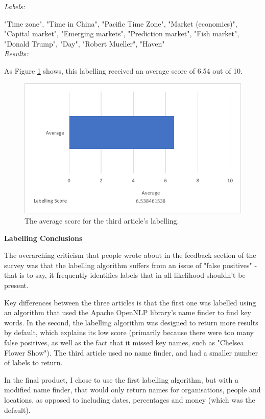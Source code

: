 \documentclass[12pt]{article}
\begin{document}
\emph{Labels:}

"Time zone", "Time in China", "Pacific Time Zone", "Market (economics)", "Capital market", "Emerging markets", "Prediction market", "Fish market", "Donald Trump", "Day", "Robert Mueller", "Haven" \\

\emph{Results:}

As Figure \ref{label3} shows, this labelling received an average score of 6.54 out of 10.

\begin{figure}[ht!]
  \centering
    \includegraphics[scale=0.7]{label3score.png}
   \caption[The average score for a labelling]{The average score for the third article's labelling.}
   \label{label3}
\end{figure} 

\textbf{Labelling Conclusions}

The overarching criticism that people wrote about in the feedback section of the survey was that the labelling algorithm suffers from an issue of "false positives" - that is to say, it frequently identifies labels that in all likelihood shouldn't be present.

Key differences between the three articles is that the first one was labelled using an algorithm that used the Apache OpenNLP library's name finder to find key words. In the second, the labelling algorithm was designed to return more results by default, which explains its low score (primarily because there were too many false positives, as well as the fact that it missed key names, such as "Chelsea Flower Show"). The third article used no name finder, and had a smaller number of labels to return.

In the final product, I chose to use the first labelling algorithm, but with a modified name finder, that would only return names for organisations, people and locations, as opposed to including dates, percentages and money (which was the default). 
\end{document}

